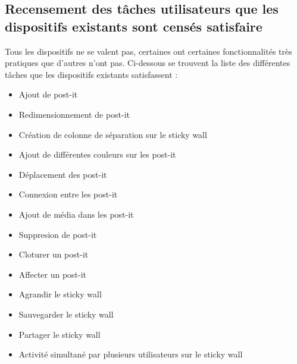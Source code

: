 \documentclass{article}
\begin{document}
\subsection{Recensement des tâches utilisateurs que les dispositifs existants sont censés satisfaire}
\hspace*{0.6cm}Tous les dispositifs ne se valent pas, certaines ont certaines fonctionnalités très pratiques que d'autres n'ont pas. Ci-dessous se trouvent la liste des différentes tâches que les dispositifs existants satisfassent :
\vspace{0.2cm}
\begin{itemize}
  \item Ajout de post-it
  \item Redimensionnement de post-it
  \item Création de colonne de séparation sur le sticky wall
  \item Ajout de différentes couleurs sur les post-it
  \item Déplacement des post-it
  \item Connexion entre les post-it
  \item Ajout de média dans les post-it
  \item Suppresion de post-it
  \item Cloturer un post-it
  \item Affecter un post-it
  \item Agrandir le sticky wall
  \item Sauvegarder le sticky wall
  \item Partager le sticky wall
  \item Activité simultané par plusieurs utilisateurs sur le sticky wall
\end{itemize}
\end{document}
